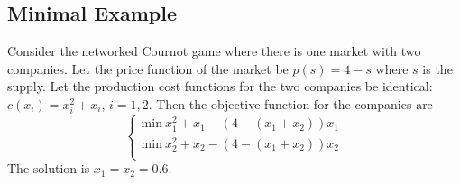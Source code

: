 \subsection*{Minimal Example}

Consider the networked Cournot game where there is one market with two companies. Let the price function of the market be $p(s) = 4 - s$ where $s$ is the supply. Let the production cost functions for the two companies be identical: $c(x_i) = x_i^2 + x_i$, $i = 1, 2$. Then the objective function for the companies are
$$\begin{cases}
\text{min} \ x_1^2 + x_1 - (4 - (x_1 + x_2)) x_1 \\
\text{min} \ x_2^2 + x_2 - (4 - (x_1 + x_2)) x_2 \\
\end{cases}$$
The solution is $x_1 = x_2 = 0.6.$


\printbibliography
